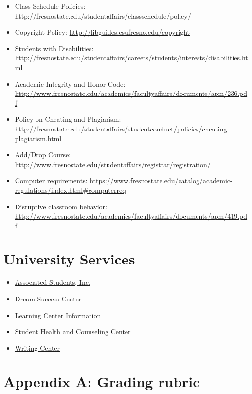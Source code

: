 \begin{itemize}
\tightlist
\item
  Class Schedule Policies:
  \url{http://fresnostate.edu/studentaffairs/classschedule/policy/}
\item
  Copyright Policy: \url{http://libguides.csufresno.edu/copyright}
\item
  Students with Disabilities:
  \url{http://fresnostate.edu/studentaffairs/careers/students/interests/disabilities.html}
\item
  Academic Integrity and Honor Code:
  \url{http://www.fresnostate.edu/academics/facultyaffairs/documents/apm/236.pdf}
\item
  Policy on Cheating and Plagiarism:
  \url{http://fresnostate.edu/studentaffairs/studentconduct/policies/cheating-plagiarism.html}
\item
  Add/Drop Course:
  \url{http://www.fresnostate.edu/studentaffairs/registrar/registration/}
\item
  Computer requirements:
  \url{https://www.fresnostate.edu/catalog/academic-regulations/index.html\#computerreq}
\item
  Disruptive classroom behavior:
  \url{http://www.fresnostate.edu/academics/facultyaffairs/documents/apm/419.pdf}
\end{itemize}

\hypertarget{university-services}{%
\section{University Services}\label{university-services}}

\begin{itemize}
\tightlist
\item
  \href{http://fresnostateasi.org/}{Associated Students, Inc.}
\item
  \href{http://fresnostate.edu/studentaffairs/dsc/index.html}{Dream
  Success Center}
\item
  \href{http://fresnostate.edu/studentaffairs/lrc}{Learning Center
  Information}
\item
  \href{https://www.fresnostate.edu/studentaffairs/health/}{Student
  Health and Counseling Center}
\item
  \href{http://www.fresnostate.edu/artshum/writingcenter/}{Writing
  Center}
\end{itemize}

\newpage

\hypertarget{appendix-a-grading-rubric}{%
\section{Appendix A: Grading rubric}\label{appendix-a-grading-rubric}}

